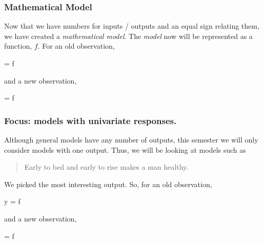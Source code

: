 \documentclass[slides]{beamer} %
\begin{document}
\begin{frame}\frametitle{Mathematical Model}

Now that we have numbers for inputs / outputs and an equal sign relating them, we have created a \textit{mathematical model}. The \textit{model} now will be represented as a function, $f$. For an old observation,

\beqn
{} = f 
\eeqn

and a new observation,

\beqn
{} = f 
\eeqn
	
\end{frame}


\begin{frame}\frametitle{Focus: models with univariate responses.}

Although general models have any number of outputs, this semester we will only consider models with one output. Thus, we will be looking at models such as

\begin{quotation}
Early to bed and early to rise makes a man healthy.
\end{quotation}

We picked the most interesting output. So, for an old observation,

\beqn
y = f 
\eeqn

and a new observation,

\beqn
\yhat = f 
\eeqn
	
\end{frame}
\end{document}
